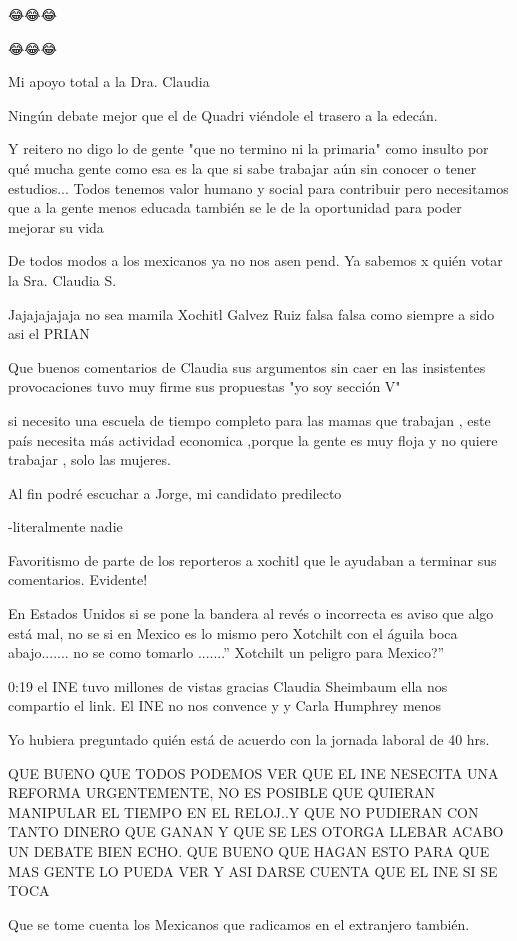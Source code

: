😂😂😂

😂😂😂

Mi apoyo total a la Dra. Claudia

Ningún debate mejor que el de Quadri viéndole el trasero a la edecán.

Y reitero no digo lo de gente "que no termino ni la primaria" como insulto por qué mucha gente como esa es la que si sabe trabajar aún sin conocer o tener estudios... Todos tenemos valor humano y social para contribuir pero necesitamos que a la gente menos educada también se le de la oportunidad para poder mejorar su vida

De todos modos a los mexicanos ya no nos asen pend. Ya sabemos   x quién votar la Sra. Claudia S.

Jajajajajaja no sea mamila Xochitl Galvez Ruiz  falsa falsa como siempre a sido asi el PRIAN

Que buenos comentarios de Claudia sus argumentos sin caer en las insistentes provocaciones tuvo muy firme sus propuestas "yo soy sección V"

si necesito una escuela de tiempo completo para las mamas que trabajan , este país necesita más actividad economica ,porque la gente es muy floja y no quiere trabajar , solo las mujeres.

Al fin podré escuchar a Jorge, mi candidato predilecto

-literalmente nadie

Favoritismo de parte de los reporteros a xochitl que le ayudaban a terminar sus comentarios. Evidente!

En Estados Unidos si se pone la bandera al revés o incorrecta es aviso que algo está mal, no se si en Mexico es lo mismo pero Xotchilt con el águila boca abajo....... no se como tomarlo .......” Xotchilt un peligro para Mexico?”

0:19  el INE tuvo millones de vistas gracias Claudia Sheimbaum ella nos compartio el link. El INE no nos convence y y Carla Humphrey menos

Yo hubiera preguntado quién está de acuerdo con la jornada laboral de 40 hrs.

QUE BUENO QUE TODOS PODEMOS VER QUE EL INE NESECITA UNA REFORMA URGENTEMENTE, NO ES POSIBLE QUE QUIERAN MANIPULAR EL TIEMPO EN EL RELOJ..Y QUE NO PUDIERAN CON TANTO DINERO QUE GANAN Y QUE SE LES OTORGA LLEBAR ACABO UN DEBATE BIEN ECHO. QUE BUENO QUE HAGAN ESTO PARA QUE MAS GENTE LO PUEDA VER Y ASI DARSE CUENTA QUE EL INE SI SE TOCA

Que se tome cuenta los Mexicanos que radicamos en el extranjero también.


